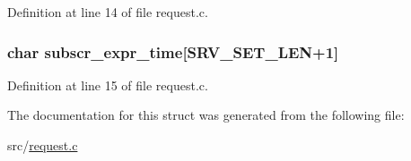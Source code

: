 Definition at line 14 of file request.c.

\hypertarget{structmtn__server__info_af80c9d633febb0cbd22b911094051a39}{
\subsubsection[{subscr\_\-expr\_\-time}]{\setlength{\rightskip}{0pt plus 5cm}char {\bf subscr\_\-expr\_\-time}\mbox{[}SRV\_\-SET\_\-LEN+1\mbox{]}}}
\label{structmtn__server__info_af80c9d633febb0cbd22b911094051a39}


Definition at line 15 of file request.c.



The documentation for this struct was generated from the following file:\begin{DoxyCompactItemize}
\item 
src/\hyperlink{request_8c}{request.c}\end{DoxyCompactItemize}
